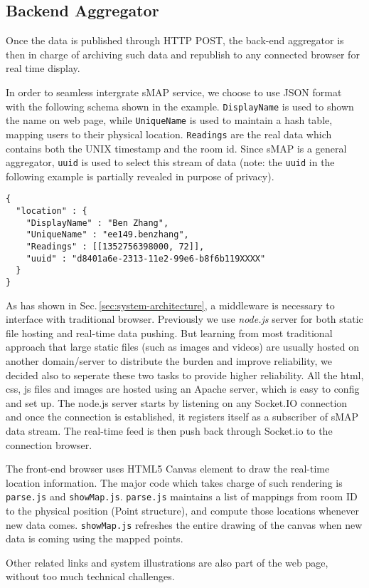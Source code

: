\subsection{Backend Aggregator}
\label{sec:backend-aggregator}
Once the data is published through HTTP POST, the back-end aggregator is then in charge of archiving such data and republish to any connected browser for real time display. 

In order to seamless intergrate sMAP service, we choose to use JSON format with the following schema shown in the example. \texttt{DisplayName} is used to shown the name on web page, while \texttt{UniqueName} is used to maintain a hash table, mapping users to their physical location. \texttt{Readings} are the real data which contains both the UNIX timestamp and the room id. Since sMAP is a general aggregator, \texttt{uuid} is used to select this stream of data (note: the \texttt{uuid} in the following example is partially revealed in purpose of privacy).  
\begin{lstlisting}
{
  "location" : {
    "DisplayName" : "Ben Zhang",
    "UniqueName" : "ee149.benzhang",
    "Readings" : [[1352756398000, 72]],
    "uuid" : "d8401a6e-2313-11e2-99e6-b8f6b119XXXX"
  }
}
\end{lstlisting}

As has shown in Sec.\,\ref{sec:system-architecture}, a middleware is necessary to interface with traditional browser. Previously we use {\em node.js} server for both static file hosting and real-time data pushing. But learning from most traditional approach that large static files (such as images and videos) are usually hosted on another domain/server to distribute the burden and improve reliability, we decided also to seperate these two tasks to provide higher reliability. All the html, css, js files and images are hosted using an Apache server, which is easy to config and set up. The node.js server starts by listening on any Socket.IO connection and once the connection is established, it registers itself as a subscriber of sMAP data stream. The real-time feed is then push back through Socket.io to the connection browser.

The front-end browser uses HTML5 Canvas element to draw the real-time location information. The major code which takes charge of such rendering is \texttt{parse.js} and \texttt{showMap.js}. \texttt{parse.js} maintains a list of mappings from room ID to the physical position (Point structure), and compute those locations whenever new data comes. \texttt{showMap.js} refreshes the entire drawing of the canvas when new data is coming using the mapped points. 

Other related links and system illustrations are also part of the web page, without too much technical challenges.

